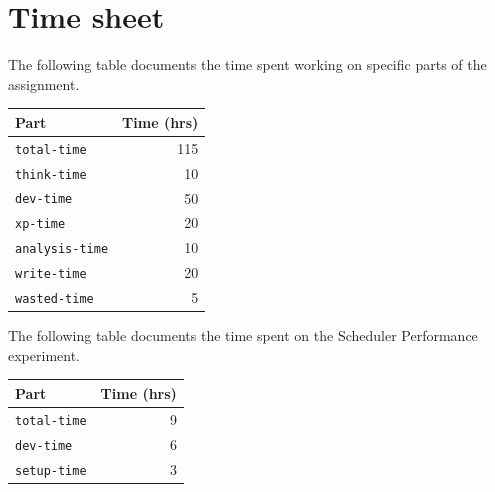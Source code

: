 \documentclass{acm_proc_article-sp}
\begin{document}
{}


\appendix
\section{Time sheet}
\label{app:a}

The following table documents the time spent working on specific parts of the assignment.

\begin{tabular}{ | l | r | }
	\hline
	Part & Time (hrs) \\ \hline \hline
	\texttt{total-time} & 115\\ \hline
	\texttt{think-time} & 10\\ \hline
	\texttt{dev-time} & 50\\ \hline
	\texttt{xp-time} & 20\\ \hline
	\texttt{analysis-time} & 10\\ \hline
	\texttt{write-time} & 20\\ \hline
	\texttt{wasted-time} & 5\\ \hline
\end{tabular}

The following table documents the time spent on the Scheduler Performance experiment.

\begin{tabular}{ | l | r | }
	\hline
	Part & Time (hrs) \\ \hline \hline
	\texttt{total-time} & 9\\ \hline
	\texttt{dev-time} & 6\\ \hline
	\texttt{setup-time} & 3\\ \hline
\end{tabular}
\end{document}
